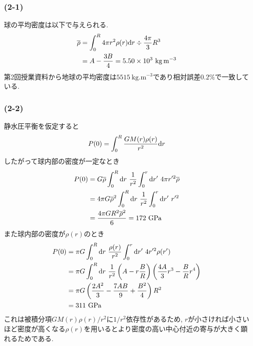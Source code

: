 \subsubsection*{(2-1)}
球の平均密度は以下で与えられる.
\begin{align}
  \begin{split}
    \overline{\rho}&=\int_0^R4\pi r^2\rho(r){\rm d}r\div\frac{4\pi}{3}R^3\\
    &=A-\frac{3B}{4}=5.50\times10^3\ \si{\kilo\gram.\metre^{-3}}
  \end{split}
\end{align}
第2回授業資料から地球の平均密度は$5515\ \si{\kilo\gram.\metre^{-3}}$であり相対誤差$0.2\%$で一致している.
\subsubsection*{(2-2)}
静水圧平衡を仮定すると
\begin{align}
  P(0)=\int_0^R\frac{GM(r)\rho(r)}{r^2}{\rm d}r
\end{align}
したがって球内部の密度が一定なとき
\begin{align}
  \begin{split}
    P(0)&=G\overline{\rho}\int_0^R{\rm d}r\ \frac{1}{r^2}\int_0^r{\rm d}r'\ 4\pi r'^2\overline{\rho}\\
    &=4\pi G\overline{\rho}^2\int_0^R{\rm d}r\ \frac{1}{r^2}\int_0^r{\rm d}r'\ r'^2\\
    &=\frac{4\pi GR^2\overline{\rho}^2}{6}=172\ \si{\giga\pascal}
  \end{split}
\end{align}
また球内部の密度が$\rho(r)$のとき
\begin{align}
  \begin{split}
    P(0)&=\pi G\int_0^R{\rm d}r\ \frac{\rho(r)}{r^2}\int_0^r{\rm d}r'\ 4r'^2\rho(r')\\
    &=\pi G\int_0^R{\rm d}r\ \frac{1}{r^2}\left(A-r\frac{B}{R}\right)\left(\frac{4A}{3}r^3-\frac{B}{R}r^4\right)\\
    &=\pi G\left(\frac{2A^2}{3}-\frac{7AB}{9}+\frac{B^2}{4}\right)R^2\\
    &=311\ \si{\giga\pascal}
  \end{split}
\end{align}
これは被積分項$GM(r)\rho(r)/r^2$に$1/r^2$依存性があるため,
$r$が小さければ小さいほど密度が高くなる$\rho(r)$を用いるとより密度の高い中心付近の寄与が大きく顕れるためである.